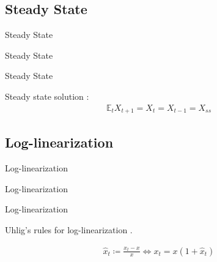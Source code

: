 \documentclass[../quali_slides.tex]{subfiles}
\begin{document}

\subsection{Steady State}

\begin{frame}{Steady State}
	
	\centering \huge Steady State
	
\end{frame}


\begin{frame}{Steady State}
	
	Steady state solution \cite[p.41]{costa_junior_understanding_2016}:
	\begin{align}
		\mathbb{E}_t X_{t+1} = X_t = X_{t-1} = X_{ss}
	\end{align}
		
\end{frame}


\subsection{Log-linearization}

\begin{frame}{Log-linearization}
	
	\centering \huge Log-linearization
		
\end{frame}


\begin{frame}{Log-linearization}
	
	Uhlig's rules for log-linearization \cite{uhlig_toolkit_1999}.
	
	\begin{align*}
		\hat{x}_t \coloneqq \frac{x_t - x}{x} \iff x_t = x(1 + \hat{x}_t)
	\end{align*}	
	
\end{frame}
\end{document}
